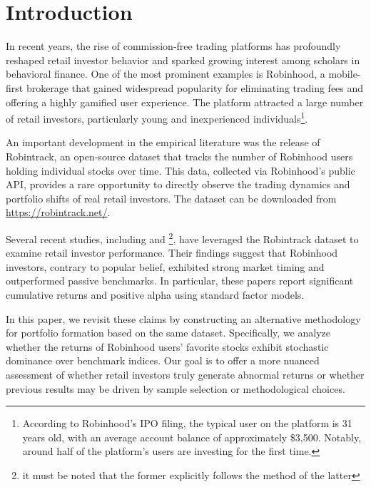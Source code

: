\section{Introduction}

In recent years, the rise of commission-free trading platforms has profoundly reshaped retail investor behavior and sparked growing interest among scholars in behavioral finance. 
One of the most prominent examples is Robinhood, a mobile-first brokerage that gained widespread popularity for eliminating trading fees and offering a highly gamified user experience. 
The platform attracted a large number of retail investors, particularly young and inexperienced individuals\footnote{
According to Robinhood's IPO filing, the typical user on the platform is 31 years old, with an average account balance of approximately \$3,500. 
Notably, around half of the platform's users are investing for the first time.}.

An important development in the empirical literature was the release of Robintrack, an open-source dataset that tracks the number of Robinhood users holding individual stocks over time. 
This data, collected via Robinhood's public API, provides a rare opportunity to directly observe the trading dynamics and portfolio shifts of real retail investors. 
The dataset can be downloaded from \url{https://robintrack.net/}.

Several recent studies, including \cite{Fedyk2024} and \cite{Welch2022}\footnote{it must be noted that the former explicitly follows the method of the latter}, 
have leveraged the Robintrack dataset to examine retail investor performance. 
Their findings suggest that Robinhood investors, contrary to popular belief, exhibited strong market timing and outperformed passive benchmarks. 
In particular, these papers report significant cumulative returns and positive alpha using standard factor models.

In this paper, we revisit these claims by constructing an alternative methodology for portfolio formation based on the same dataset. 
Specifically, we analyze whether the returns of Robinhood users' favorite stocks exhibit stochastic dominance over benchmark indices.
Our goal is to offer a more nuanced assessment of whether retail investors truly generate abnormal returns or whether previous results may be driven by sample selection or methodological choices.